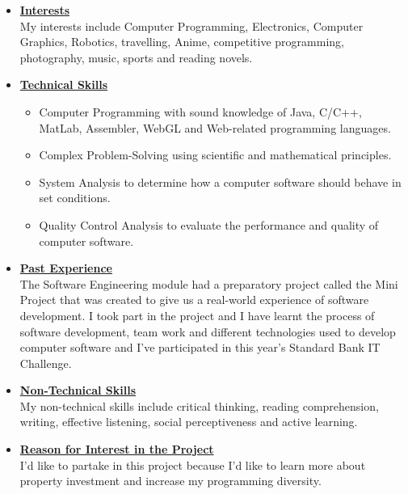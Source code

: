 \documentclass[a4paper,12pt]{article}
\begin{document}
\begin{itemize}
\item {\large \underline{\textbf{Interests}}}\\[0.2cm]
My interests include Computer Programming, Electronics, Computer Graphics, Robotics, travelling, Anime, competitive programming, photography, music, sports and reading novels.
\\
\item {\large \underline{\textbf{Technical Skills}}}

	\begin{itemize}
		\item Computer Programming with sound knowledge of Java, C/C++, MatLab, Assembler, WebGL and Web-related 					programming languages.
		\item Complex Problem-Solving using scientific and mathematical principles.
		\item System Analysis to determine how a computer software should behave in set conditions.
		\item Quality Control Analysis to evaluate the performance and quality of computer software.
	\end{itemize}
\bigskip
\item {\large \underline{\textbf{Past Experience}}}\\[0.2cm]
The Software Engineering module had a preparatory project called the Mini Project that was created to give us a real-world experience of software development. I took part in the project and I have learnt the process of software development, team work and different technologies used to develop computer software and I've participated in this year's Standard Bank IT Challenge. 
\\
\item {\large \underline{\textbf{Non-Technical Skills}}}\\[0.2cm]
My non-technical skills include critical thinking, reading comprehension, writing, effective listening, social perceptiveness and active learning. 

\newpage
\item {\large \underline{\textbf{Reason for Interest in the Project}}}\\[0.2cm]
I'd like to partake in this project because I'd like to learn more about property investment and increase my programming diversity.

\end{itemize}

\newpage
\end{document}

